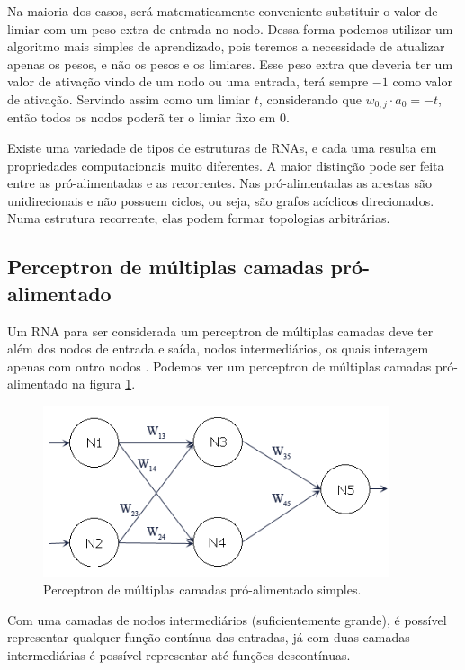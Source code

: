 Na maioria dos casos, será matematicamente conveniente substituir o valor de limiar com um peso extra de entrada no nodo. Dessa forma podemos utilizar um algoritmo mais simples de aprendizado, pois teremos a necessidade de atualizar apenas os pesos, e não os pesos e os limiares. Esse peso extra que deveria ter um valor de ativação vindo de um nodo ou uma entrada, terá sempre $-1$ como valor de ativação. Servindo assim como um limiar $t$, considerando que $w_{0,j} \cdot a_0 = -t$, então todos os nodos poderã ter o limiar fixo em 0.

Existe uma variedade de tipos de estruturas de RNAs, e cada uma resulta em propriedades computacionais muito diferentes. A maior distinção pode ser feita entre as pró-alimentadas e as recorrentes. Nas pró-alimentadas as arestas são unidirecionais e não possuem ciclos, ou seja, são grafos acíclicos direcionados. Numa estrutura recorrente, elas podem formar topologias arbitrárias.

\subsection{Perceptron de múltiplas camadas pró-alimentado}

Um RNA para ser considerada um perceptron de múltiplas camadas deve ter além dos nodos de entrada e saída, nodos intermediários, os quais interagem apenas com outro nodos \cite{sandhya}. Podemos ver um perceptron de múltiplas camadas pró-alimentado na figura \ref{fig:rna}.

\begin{figure}[ht]
 \begin{center}
  \includegraphics[width=4in]{imagens/rna.png}
 \end{center}
 \caption{Perceptron de múltiplas camadas pró-alimentado simples.}
 \label{fig:rna}
\end{figure}

Com uma camadas de nodos intermediários (suficientemente grande), é possível representar qualquer função contínua das entradas, já com duas camadas intermediárias é possível representar até funções descontínuas.


